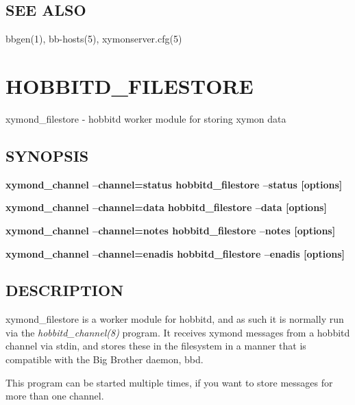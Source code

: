 \subsection{SEE ALSO}
bbgen(1), bb-hosts(5), xymonserver.cfg(5) 

 


  
%
%
\newpage
\section{HOBBITD\_FILESTORE}

 xymond\_filestore - hobbitd worker module for storing xymon data \subsection{SYNOPSIS}
\textbf{xymond\_channel --channel=status hobbitd\_filestore --status [options]}
 
\textbf{xymond\_channel --channel=data hobbitd\_filestore --data [options]}
 
\textbf{xymond\_channel --channel=notes hobbitd\_filestore --notes [options]}
 
\textbf{xymond\_channel --channel=enadis hobbitd\_filestore --enadis [options]}


 
\subsection{DESCRIPTION}
 xymond\_filestore is a worker module for hobbitd, and as such it is normally run via the \emph{hobbitd\_channel(8)}
 program. It receives xymond messages from a hobbitd channel via stdin, and stores these in the filesystem in a manner that is compatible with the Big Brother daemon, bbd. 

  This program can be started multiple times, if you want to store messages for more than one channel. 


 
